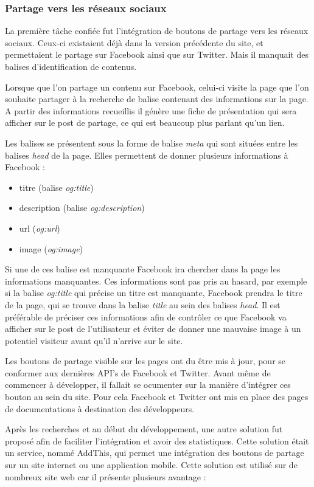 \documentclass[12pt,a4paper]{article}
\begin{document}
\subsubsection{Partage vers les réseaux sociaux}
La première tâche confiée fut l'intégration de boutons de partage vers les réseaux sociaux. Ceux-ci existaient déjà dans la version précédente du site, et permettaient le partage sur Facebook ainsi que sur Twitter. Mais il manquait des balises d'identification de contenus.\par 
Lorsque que l'on partage un contenu sur Facebook, celui-ci visite la page que l'on souhaite partager à la recherche de balise contenant des informations sur la page. A partir des informations recueillis il génère une fiche de présentation qui sera afficher sur le post de partage, ce qui est beaucoup plus parlant qu'un lien.\par
Les balises se présentent sous la forme de balise \textit{meta} qui sont situées entre les balises \textit{head} de la page. Elles permettent de donner plusieurs informations à Facebook :
\begin{itemize}
\item titre (balise \textit{og:title})
\item description (balise \textit{og:description})
\item url (\textit{og:url})
\item image (\textit{og:image})
\end{itemize}
Si une de ces balise est manquante Facebook ira chercher dans la page les informations manquantes. Ces informations sont pas pris au hasard, par exemple si la balise \textit{og:title} qui précise un titre est manquante, Facebook prendra le titre de la page, qui se trouve dans la balise \textit{title} au sein des balises \textit{head}. Il est préférable de préciser ces informations afin de contrôler ce que Facebook va afficher sur le post de l'utilisateur et éviter de donner une mauvaise image à un potentiel visiteur avant qu'il n'arrive sur le site.\par
\bigskip
Les boutons de partage visible sur les pages ont du être mis à jour, pour se conformer aux dernières API's de Facebook et Twitter. Avant même de commencer à développer, il fallait se ocumenter sur la manière d'intégrer ces bouton au sein du site. Pour cela Facebook et Twitter ont mis en place des pages de documentations à destination des développeurs. \par 
Après les recherches et au début du développement, une autre solution fut proposé afin de faciliter l'intégration et avoir des statistiques. Cette solution était un service, nommé AddThis, qui permet une intégration des boutons de partage sur un site internet ou une application mobile. Cette solution est utilisé sur de nombreux site web car il présente plusieurs avantage : 
\end{document}
